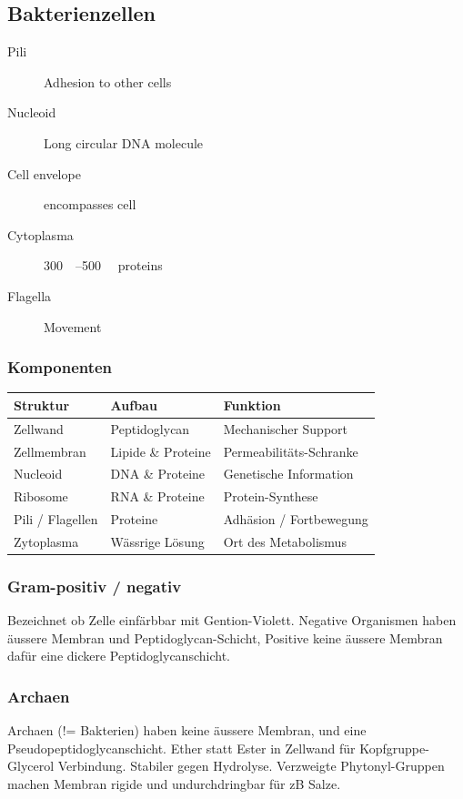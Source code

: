 \documentclass[a4paper,twocolumn,english,fontsize=7,DIV=16]{scrartcl}
\begin{document}
\subsection{Bakterienzellen}

\begin{description}
	\item[Pili] Adhesion to other cells
	\item[Nucleoid] Long circular DNA molecule
	\item[Cell envelope] encompasses cell
	\item[Cytoplasma] \SIrange{300}{500}{\milli\Molar} proteins
	\item[Flagella] Movement
\end{description}

\subsubsection{Komponenten}

\begin{tabu}{lll}
	\toprule
	Struktur & Aufbau & Funktion \\
	\midrule
	Zellwand & Peptidoglycan & Mechanischer Support \\
	Zellmembran & Lipide \& Proteine & Permeabilitäts-Schranke \\
	Nucleoid & DNA \& Proteine & Genetische Information \\
	Ribosome & RNA \& Proteine & Protein-Synthese \\
	Pili / Flagellen & Proteine & Adhäsion / Fortbewegung \\
	Zytoplasma & Wässrige Lösung & Ort des Metabolismus \\
	\bottomrule
\end{tabu}

\subsubsection{Gram-positiv / negativ}

Bezeichnet ob Zelle einfärbbar mit Gention-Violett. Negative Organismen haben
äussere Membran und Peptidoglycan-Schicht, Positive keine äussere Membran dafür
eine dickere Peptidoglycanschicht.

\subsubsection{Archaen}

Archaen (!= Bakterien) haben keine äussere Membran, und eine
Pseudopeptidoglycanschicht. Ether statt Ester in Zellwand für
Kopfgruppe-Glycerol Verbindung. Stabiler gegen Hydrolyse. Verzweigte
Phytonyl-Gruppen machen Membran rigide und undurchdringbar für zB Salze.
\end{document}
